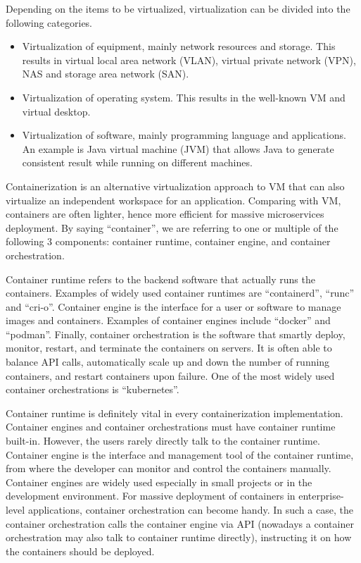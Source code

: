 Depending on the items to be virtualized, virtualization can be divided into the following categories.
\begin{itemize}
  \item Virtualization of equipment, mainly network resources and storage. This results in virtual local area network (VLAN), virtual private network (VPN), NAS and storage area network (SAN).
  \item Virtualization of operating system. This results in the well-known VM and virtual desktop.
  \item Virtualization of software, mainly programming language and applications. An example is Java virtual machine (JVM) that allows Java to generate consistent result while running on different machines.
\end{itemize}

Containerization is an alternative virtualization approach to VM that can also virtualize an independent workspace for an application. Comparing with VM, containers are often lighter, hence more efficient for massive microservices deployment. By saying ``container'', we are referring to one or multiple of the following 3 components: container runtime, container engine, and container orchestration.

Container runtime refers to the backend software that actually runs the containers. Examples of widely used container runtimes are ``containerd'', ``runc'' and ``cri-o''. Container engine is the interface for a user or software to manage images and containers. Examples of container engines include ``docker'' and ``podman''. Finally, container orchestration is the software that smartly deploy, monitor, restart, and terminate the containers on servers. It is often able to balance API calls, automatically scale up and down the number of running containers, and restart containers upon failure. One of the most widely used container orchestrations is ``kubernetes''. 

Container runtime is definitely vital in every containerization implementation. Container engines and container orchestrations must have container runtime built-in. However, the users rarely directly talk to the container runtime. Container engine is the interface and management tool of the container runtime, from where the developer can monitor and control the containers manually. Container engines are widely used especially in small projects or in the development environment. For massive deployment of containers in enterprise-level applications, container orchestration can become handy. In such a case, the container orchestration calls the container engine via API (nowadays a container orchestration may also talk to container runtime directly), instructing it on how the containers should be deployed.

